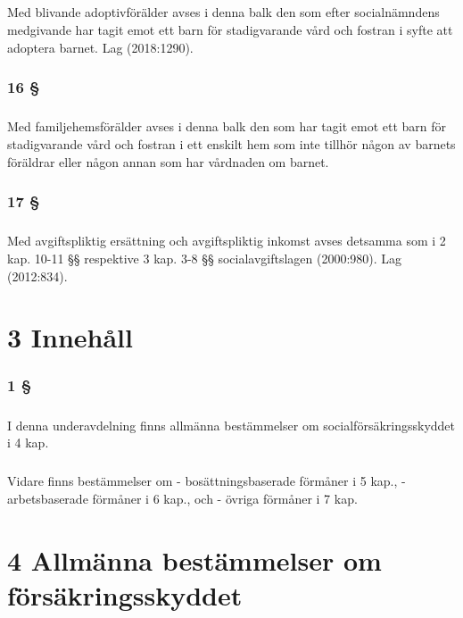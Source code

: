 \documentclass[a4paper,notitlepage,openany,10pt]{book}
\begin{document}
\paragraph*{}
Med blivande adoptivförälder avses i denna balk den som efter socialnämndens medgivande har tagit emot ett barn för stadigvarande vård och fostran i syfte att adoptera barnet.
Lag (2018:1290).
\subsection*{16 §}
\paragraph*{}
Med familjehemsförälder avses i denna balk den som har tagit emot ett barn för stadigvarande vård och fostran i ett enskilt hem som inte tillhör någon av barnets föräldrar eller någon annan som har vårdnaden om barnet.
\subsection*{17 §}
\paragraph*{}
Med avgiftspliktig ersättning och avgiftspliktig inkomst avses detsamma som i 2 kap. 10-11 §§ respektive 3 kap. 3-8 §§ socialavgiftslagen (2000:980).
Lag (2012:834).
\chapter*{3 Innehåll}
\subsection*{1 §}
\paragraph*{}
I denna underavdelning finns allmänna bestämmelser om socialförsäkringsskyddet i 4 kap.
\paragraph*{}
Vidare finns bestämmelser om
\newline - bosättningsbaserade förmåner i 5 kap.,
\newline - arbetsbaserade förmåner i 6 kap., och
\newline - övriga förmåner i 7 kap.
\chapter*{4 Allmänna bestämmelser om försäkringsskyddet}
\end{document}
